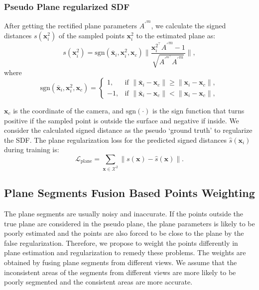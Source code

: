 \documentclass[10pt,journal,compsoc]{IEEEtran}
\begin{document}
	\subsubsection{Pseudo Plane regularized SDF}
	After getting the rectified plane parameters ${A^\prime}^m$, we calculate the signed distances $s(\bm{x}^2_i)$ of the sampled points $\bm{x}^2_i$ to the estimated plane as:
	\begin{equation}
		s(\bm{x}^2_i) =\text{sgn}({\bm{\bar{x}}_i}, \bm{x}^2_i, \bm{x}_c)	\|\frac{{\bm{x}_i^{2^{\scriptstyle\top}}}{A^\prime}^m - 1}{\sqrt{A^{\prime^{m^{\scriptstyle\top}}} {A^\prime}^m}}\|,
	\end{equation}
	where
	\begin{equation}
		\text{sgn}({\bm{\bar{x}}_i}, \bm{x}^2_i, \bm{x}_c) = \begin{cases}1, & \text{if } \|{\bm{\bar{x}}}_i - \bm{x}_c\| \geq \|{\bm{x}}_i - \bm{x}_c\|, \\ -1, & \text{if } \|{\bm{\bar{x}}}_i - \bm{x}_c\| < \|{\bm{x}}_i - \bm{x}_c\|, \end{cases}
	\end{equation}

$\bm{x}_c$ is the coordinate of the camera, and $\text{sgn}(\cdot)$ is the sign function that turns positive if the sampled point is outside the surface and negative if inside. We consider the calculated signed distance as the pseudo `ground truth' to regularize the SDF. The plane regularization loss for the predicted signed distances $\hat{s}(\bm{x}_i)$ during training is:
\begin{equation}
	\mathcal{L}_{\text{plane}} = \sum_{\bm{x} \in {\mathcal{X}}^2}\|s(\bm{x}) - \hat{s}(\bm{x})\|.
	\label{eq:l_plane}
\end{equation}

\subsection{Plane Segments Fusion Based Points Weighting}
The plane segments are usually noisy and inaccurate. If the points outside the true plane are considered in the pseudo plane, the plane parameters is likely to be poorly estimated and the points are also forced to be close to the plane by the false regularization. Therefore, we propose to weight the points differently in plane estimation and regularization to remedy these problems. The weights are obtained by fusing plane segments from different views. We assume that the inconsistent areas of the segments from different views are more likely to be poorly segmented and the consistent areas are more accurate.
\end{document}
